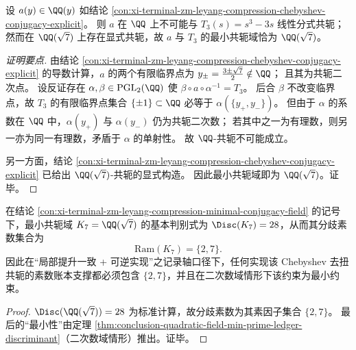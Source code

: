 \begin{conclusion}\label{con:xi-terminal-zm-leyang-compression-minimal-conjugacy-field}
设 \(a(y)\in\QQ(y)\) 如结论 \ref{con:xi-terminal-zm-leyang-compression-chebyshev-conjugacy-explicit}。
则 \(a\) 在 \(\QQ\) 上不可能与 \(T_{3}(s)=s^{3}-3s\) 线性分式共轭；
然而在 \(\QQ(\sqrt7)\) 上存在显式共轭，故 \(a\) 与 \(T_3\) 的最小共轭域恰为 \(\QQ(\sqrt7)\)。
\end{conclusion}
\begin{proof}[证明要点]
由结论 \ref{con:xi-terminal-zm-leyang-compression-chebyshev-conjugacy-explicit} 的导数计算，\(a\) 的两个有限临界点为
\(
y_{\pm}=\frac{3\pm\sqrt7}{2}
\notin\QQ
\)；
且其为共轭二次点。
设反证存在 \(\alpha,\beta\in\mathrm{PGL}_{2}(\QQ)\) 使 \(\beta\circ a\circ\alpha^{-1}=T_{3}\)。
后合 \(\beta\) 不改变临界点，故 \(T_{3}\) 的有限临界点集合 \(\{\pm 1\}\subset\QQ\) 必等于 \(\alpha(\{y_{+},y_{-}\})\)。
但由于 \(\alpha\) 的系数在 \(\QQ\) 中，\(\alpha(y_{+})\) 与 \(\alpha(y_{-})\) 仍为共轭二次数；
若其中之一为有理数，则另一亦为同一有理数，矛盾于 \(\alpha\) 的单射性。
故 \(\QQ\)-共轭不可能成立。
\par
另一方面，结论 \ref{con:xi-terminal-zm-leyang-compression-chebyshev-conjugacy-explicit} 已给出 \(\QQ(\sqrt7)\)-共轭的显式构造。
因此最小共轭域即为 \(\QQ(\sqrt7)\)。证毕。
\end{proof}

\begin{corollary}\label{cor:xi-terminal-zm-leyang-chebyshev-min-conjugacy-ramification-2-7}
在结论 \ref{con:xi-terminal-zm-leyang-compression-minimal-conjugacy-field} 的记号下，最小共轭域 \(K_7=\QQ(\sqrt7)\) 的基本判别式为 \(\Disc(K_7)=28\)，从而其分歧素数集合为
\[
\mathrm{Ram}(K_7)=\{2,7\}.
\]
因此在“局部提升一致 + 可逆实现”之记录轴口径下，任何实现该 Chebyshev 去扭共轭的素数账本支撑都必须包含 \(\{2,7\}\)，并且在二次数域情形下该约束为最小约束。
\end{corollary}
\begin{proof}
\(\Disc(\QQ(\sqrt7))=28\) 为标准计算，故分歧素数为其素因子集合 \(\{2,7\}\)。
最后的“最小性”由定理 \ref{thm:conclusion-quadratic-field-min-prime-ledger-discriminant}（二次数域情形）推出。证毕。
\end{proof}



\endinput
